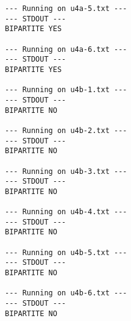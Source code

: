 \documentclass{article}
\begin{document}
\begin{verbatim}
--- Running on u4a-5.txt ---
--- STDOUT ---
BIPARTITE YES

--- Running on u4a-6.txt ---
--- STDOUT ---
BIPARTITE YES

--- Running on u4b-1.txt ---
--- STDOUT ---
BIPARTITE NO

--- Running on u4b-2.txt ---
--- STDOUT ---
BIPARTITE NO

--- Running on u4b-3.txt ---
--- STDOUT ---
BIPARTITE NO

--- Running on u4b-4.txt ---
--- STDOUT ---
BIPARTITE NO

--- Running on u4b-5.txt ---
--- STDOUT ---
BIPARTITE NO

--- Running on u4b-6.txt ---
--- STDOUT ---
BIPARTITE NO

\end{verbatim}
\end{document}
